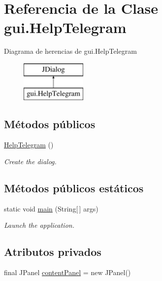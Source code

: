 \hypertarget{classgui_1_1_help_telegram}{}\section{Referencia de la Clase gui.\+Help\+Telegram}
\label{classgui_1_1_help_telegram}
Diagrama de herencias de gui.\+Help\+Telegram\begin{figure}[H]
\begin{center}
\leavevmode
\includegraphics[height=2.000000cm]{classgui_1_1_help_telegram}
\end{center}
\end{figure}
\subsection*{Métodos públicos}
\begin{DoxyCompactItemize}
\item 
\mbox{\hyperlink{classgui_1_1_help_telegram_a74bf844c45b4063a5c7d4956b13af89c}{Help\+Telegram}} ()
\begin{DoxyCompactList}\small\item\em Create the dialog. \end{DoxyCompactList}\end{DoxyCompactItemize}
\subsection*{Métodos públicos estáticos}
\begin{DoxyCompactItemize}
\item 
static void \mbox{\hyperlink{classgui_1_1_help_telegram_a61edf978593e59290943e50a2a5ff367}{main}} (String\mbox{[}$\,$\mbox{]} args)
\begin{DoxyCompactList}\small\item\em Launch the application. \end{DoxyCompactList}\end{DoxyCompactItemize}
\subsection*{Atributos privados}
\begin{DoxyCompactItemize}
\item 
final J\+Panel \mbox{\hyperlink{classgui_1_1_help_telegram_add5420f3af5cd44b1e10bd946e8a8906}{content\+Panel}} = new J\+Panel()
\end{DoxyCompactItemize}


